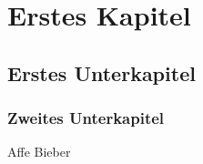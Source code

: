 \chapter{Erstes Kapitel}                %
\section{Erstes Unterkapitel}           %
\subsection{Zweites Unterkapitel}       %

Affe
Bieber